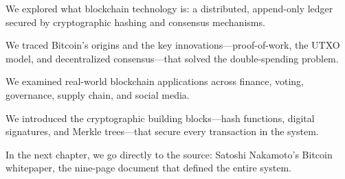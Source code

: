 \begin{chaptersummary}
  \item We explored what blockchain technology is: a distributed, append-only ledger secured by cryptographic hashing and consensus mechanisms.
  \item We traced Bitcoin's origins and the key innovations---proof-of-work, the UTXO model, and decentralized consensus---that solved the double-spending problem.
  \item We examined real-world blockchain applications across finance, voting, governance, supply chain, and social media.
  \item We introduced the cryptographic building blocks---hash functions, digital signatures, and Merkle trees---that secure every transaction in the system.
  \item In the next chapter, we go directly to the source: Satoshi Nakamoto's Bitcoin whitepaper, the nine-page document that defined the entire system.
\end{chaptersummary}
